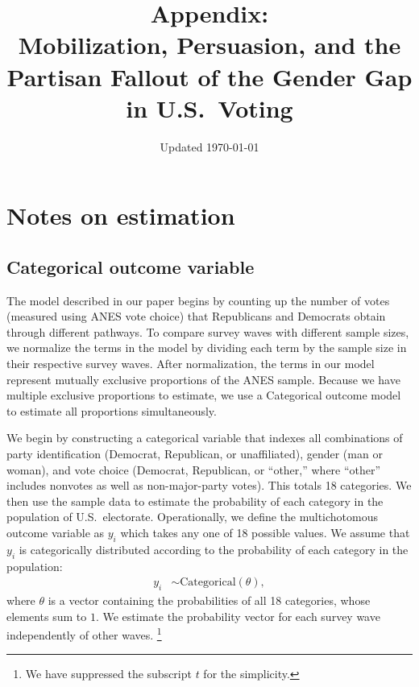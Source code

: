 \documentclass[12pt
               ,final
               ]{article}
\begin{document}
\title{Appendix: \\ Mobilization, Persuasion, and the Partisan Fallout of the Gender Gap in U.S.\ Voting}
\author{}
\date{Updated \today}
\maketitle

\onehalfspacing


\section*{Notes on estimation}

\subsection*{Categorical outcome variable}

The model described in our paper begins by counting up the number of votes (measured using ANES vote choice) that Republicans and Democrats obtain through different pathways. To compare survey waves with different sample sizes, we normalize the terms in the model by dividing each term by the sample size in their respective survey waves. After normalization, the terms in our model represent mutually exclusive proportions of the ANES sample. Because we have multiple exclusive proportions to estimate, we use a Categorical outcome model to estimate all proportions simultaneously.

We begin by constructing a categorical variable that indexes all combinations of party identification (Democrat, Republican, or unaffiliated), gender (man or woman), and vote choice (Democrat, Republican, or ``other,'' where ``other'' includes nonvotes as well as non-major-party votes). This totals 18 categories. We then use the sample data to estimate the probability of each category in the population of U.S.\ electorate. Operationally, we define the multichotomous outcome variable as $y_{i}$ which takes any one of 18 possible values. We assume that $y_{i}$ is categorically distributed according to the probability of each category in the population:
  \begin{align}
    y_{i} &\sim \mathrm{Categorical}\left( \theta \right),
  \end{align}
where $\theta$ is a vector containing the probabilities of all 18 categories, whose elements sum to $1$. We estimate the probability vector for each survey wave independently of other waves.%
  \footnote{We have suppressed the subscript $t$ for the simplicity.}
\end{document}

